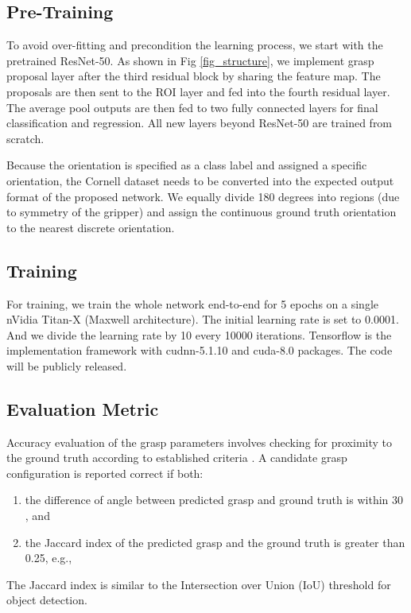 \documentclass[letterpaper, 10 pt, journal, twoside]{IEEEtran}
\begin{document}
\subsection{Pre-Training}
To avoid over-fitting and precondition the learning process,  we start
with the pretrained ResNet-50. As shown in Fig \ref{fig_structure}, we
implement grasp proposal layer after the third residual block by sharing
the feature map. The proposals are then sent to the ROI layer and fed into
the fourth residual layer. The  average pool outputs are then
fed to two fully connected layers for final classification and
regression. All new layers beyond ResNet-50 are trained from scratch. 


Because the orientation is specified as a class label and assigned a
specific orientation, the Cornell dataset needs to be converted into the
expected output format of the proposed network.  We equally divide 180
degrees into  regions (due to symmetry of the gripper)
and assign the continuous ground truth orientation to the nearest discrete
orientation.

\subsection{Training}
For training, we train the whole network end-to-end for 5 epochs on a
single nVidia Titan-X (Maxwell architecture). The initial learning rate
is set to 0.0001. And we divide the learning rate by 10 every 10000
iterations. Tensorflow is the implementation framework with
cudnn-5.1.10 and cuda-8.0 packages.  The code will be publicly released.

\subsection{Evaluation Metric}
Accuracy evaluation of the grasp parameters involves checking for proximity
to the ground truth according to established criteria \cite{redmon2015real}. 
A candidate grasp configuration is reported correct if both:
\begin{enumerate}
  \item the difference of angle between predicted grasp  and ground
    truth  is within 30 , and
  \item the Jaccard index of the predicted grasp  and the ground truth
     is greater than 0.25, e.g.,
    
\end{enumerate}
The Jaccard index is similar to the Intersection over Union (IoU) threshold
for object detection.  
\end{document}
